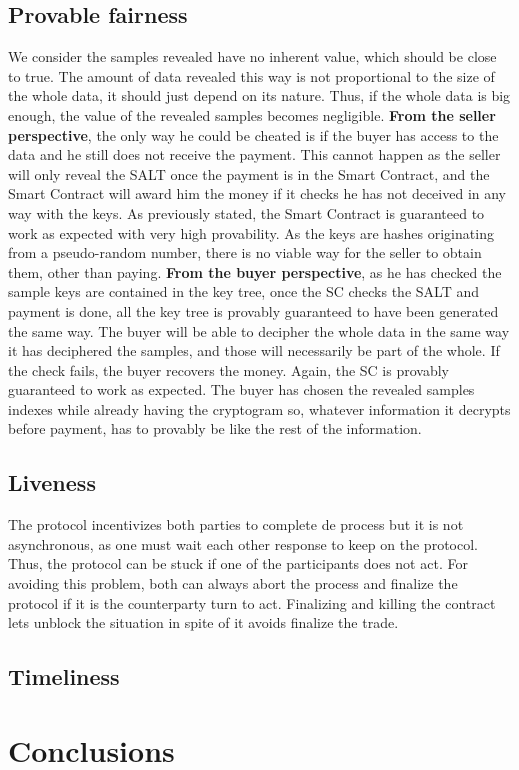 \documentclass[]{article}
\begin{document}
\subsection{Provable fairness}
We consider the samples revealed have no inherent value, which should be close to true. The amount of data revealed this way is not proportional to the size of the whole data, it should just depend on its nature. Thus, if the whole data is big enough, the value of the revealed samples becomes negligible.
\textbf{From the seller perspective}, the only way he could be cheated is if the buyer has access to the data and he still does not receive the payment. This cannot happen as the seller will only reveal the SALT once the payment is in the Smart Contract, and the Smart Contract will award him the money if it checks he has not deceived in any way with the keys. As previously stated, the Smart Contract is guaranteed to work as expected with very high provability. As the keys are hashes originating from a pseudo-random number, there is no viable way for the seller to obtain them, other than paying.
\textbf{From the buyer perspective}, as he has checked the sample keys are contained in the key tree, once the SC checks the SALT and payment is done, all the key tree is provably guaranteed to have been generated the same way. The buyer will be able to decipher the whole data in the same way it has deciphered the samples, and those will necessarily be part of the whole. If the check fails, the buyer recovers the money. Again, the SC is provably guaranteed to work as expected. The buyer has chosen the revealed samples indexes while already having the cryptogram so, whatever information it decrypts before payment, has to provably be like the rest of the information.

\subsection{Liveness}
The protocol incentivizes both parties to complete de process but it is not asynchronous, as one must wait each other response to keep on the protocol. Thus, the protocol can be stuck if one of the participants does not act. For avoiding this problem, both can always abort the process and finalize the protocol if it is the counterparty turn to act. Finalizing and killing the contract lets unblock the situation in spite of it avoids finalize the trade.
\subsection{Timeliness}


\section{Conclusions}



% 
% 

\end{document}
